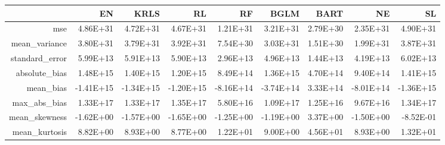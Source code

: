\begin{table}[ht]
\centering
\begin{tabular}{rrrrrrrrr}
  \hline
 & EN & KRLS & RL & RF & BGLM & BART & NE & SL \\ 
  \hline
mse & 4.86E+31 & 4.72E+31 & 4.67E+31 & 1.21E+31 & 3.21E+31 & 2.79E+30 & 2.35E+31 & 4.90E+31 \\ 
  mean\_variance & 3.80E+31 & 3.79E+31 & 3.92E+31 & 7.54E+30 & 3.03E+31 & 1.51E+30 & 1.99E+31 & 3.87E+31 \\ 
  standard\_error & 5.99E+13 & 5.91E+13 & 5.90E+13 & 2.96E+13 & 4.96E+13 & 1.44E+13 & 4.19E+13 & 6.02E+13 \\ 
  absolute\_bias & 1.48E+15 & 1.40E+15 & 1.20E+15 & 8.49E+14 & 1.36E+15 & 4.70E+14 & 9.40E+14 & 1.41E+15 \\ 
  mean\_bias & -1.41E+15 & -1.34E+15 & -1.20E+15 & -8.16E+14 & -3.74E+14 & 3.33E+14 & -8.01E+14 & -1.36E+15 \\ 
  max\_abs\_bias & 1.33E+17 & 1.33E+17 & 1.35E+17 & 5.80E+16 & 1.09E+17 & 1.25E+16 & 9.67E+16 & 1.34E+17 \\ 
  mean\_skewness & -1.62E+00 & -1.57E+00 & -1.65E+00 & -1.25E+00 & -1.19E+00 & 3.37E+00 & -1.50E+00 & -8.52E-01 \\ 
  mean\_kurtosis & 8.82E+00 & 8.93E+00 & 8.77E+00 & 1.22E+01 & 9.00E+00 & 4.56E+01 & 8.93E+00 & 1.32E+01 \\ 
   \hline
\end{tabular}
\end{table}

